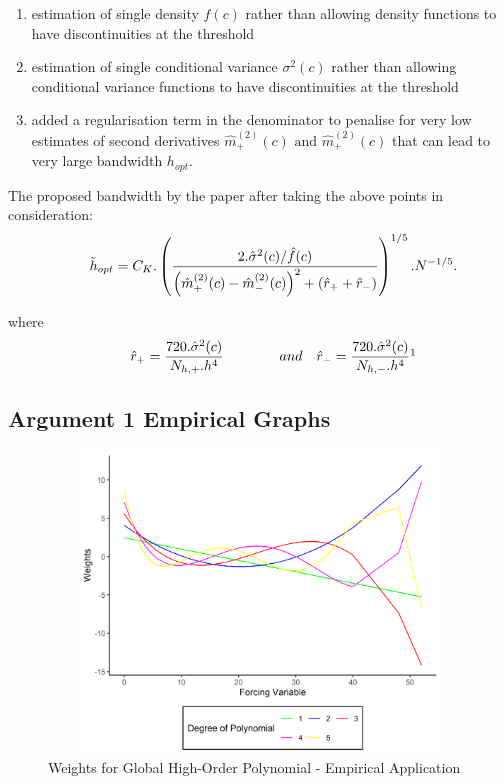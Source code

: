 \documentclass[fleqn]{article}
\begin{document}
    \begin{enumerate}
        \item estimation of single density $f(c)$ rather than allowing density functions to have discontinuities at the threshold
        \item estimation of single conditional variance $\sigma^2(c)$ rather than allowing conditional variance functions to have discontinuities at the threshold
        \item added a regularisation term in the denominator to penalise for very low estimates of second derivatives $\hat{m}^{(2)}_+(c) \text{ and } \hat{m}^{(2)}_+(c)$ that can lead to very large bandwidth $h_{opt}$.
    \end{enumerate}

    The proposed bandwidth by the paper after taking the above points in consideration:\\
    \begin{equation}
        \qquad \Tilde{h}_{opt} = C_K.\left(\frac{2.\hat{\sigma}^2(c)/\hat{f}(c)}{\left( \hat{m}^{(2)}_+(c) - \hat{m}^{(2)}_-(c)\right)^2 + \left(\hat{r}_+ + \hat{r}_- \right)} \right)^ {1/5}.N^{-1/5}.
    \end{equation}

    where \\
    \begin{equation*}
        \qquad \hat{r}_+ = \frac{720.\hat{\sigma}^2(c)}{N_{h,+}.h^4} \qquad \qquad and \quad \hat{r}_- = \frac{720.\hat{\sigma}^2(c)}{N_{h,-}.h^4}\footnotemark
    \end{equation*}

    
    \subsection{Argument 1 Empirical Graphs}
    \label{subsec: tables and graphs}
    \clearpage
    
    \begin{figure}
        \centering
        \includegraphics[width = 15cm,height = 8cm]{arg1_emp.png}
        \caption{Weights for Global High-Order Polynomial - Empirical Application}
        \label{fig:arg1_emp}
    \end{figure}
    
\end{document}
